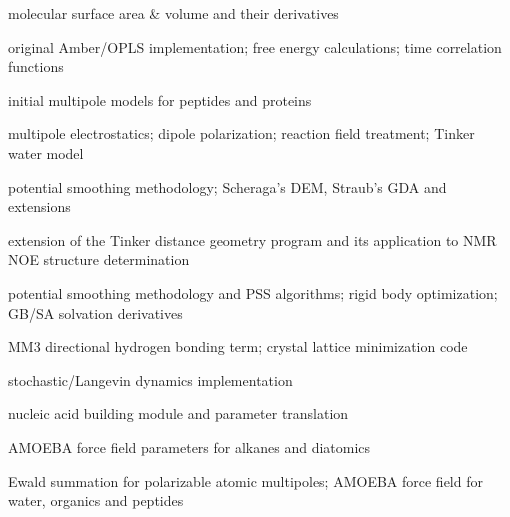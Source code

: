 \documentclass[letterpaper,11pt,english]{sphinxmanual}
\begin{document}
\sphinxAtStartPar
molecular surface area \& volume and their derivatives

\sphinxAtStartPar
{}

\sphinxAtStartPar
original Amber/OPLS implementation; free energy calculations; time correlation functions

\sphinxAtStartPar
{}

\sphinxAtStartPar
initial multipole models for peptides and proteins

\sphinxAtStartPar
{}

\sphinxAtStartPar
multipole electrostatics; dipole polarization; reaction field treatment; Tinker water model

\sphinxAtStartPar
{}

\sphinxAtStartPar
potential smoothing methodology; Scheraga’s DEM, Straub’s GDA and extensions

\sphinxAtStartPar
{}

\sphinxAtStartPar
extension of the Tinker distance geometry program and its application to NMR NOE structure determination

\sphinxAtStartPar
{}

\sphinxAtStartPar
potential smoothing methodology and PSS algorithms; rigid body optimization; GB/SA solvation derivatives

\sphinxAtStartPar
{}

\sphinxAtStartPar
MM3 directional hydrogen bonding term; crystal lattice minimization code

\sphinxAtStartPar
{}

\sphinxAtStartPar
stochastic/Langevin dynamics implementation

\sphinxAtStartPar
{}

\sphinxAtStartPar
nucleic acid building module and parameter translation

\sphinxAtStartPar
{}

\sphinxAtStartPar
AMOEBA force field parameters for alkanes and diatomics

\sphinxAtStartPar
{}

\sphinxAtStartPar
Ewald summation for polarizable atomic multipoles; AMOEBA force field for water, organics and peptides
\end{document}
